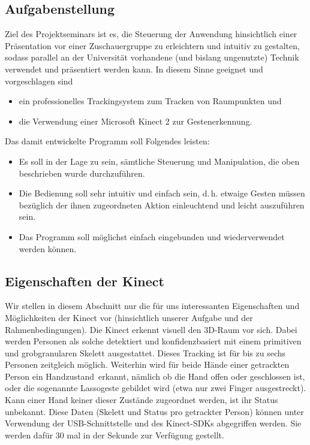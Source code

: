 \documentclass[12pt,a4paper]{article}
\begin{document}
	\subsection{Aufgabenstellung}
	Ziel des Projektseminars ist es, die Steuerung der Anwendung hinsichtlich einer Präsentation vor einer Zuschauergruppe zu erleichtern und intuitiv zu gestalten, sodass parallel an der Universität vorhandene (und bislang ungenutzte) Technik verwendet und präsentiert werden kann. In diesem Sinne geeignet und vorgeschlagen sind
	\begin{itemize}
		\item ein professionelles Trackingsystem zum Tracken von Raumpunkten und
		\item die Verwendung einer Microsoft Kinect 2 zur Gestenerkennung.
	\end{itemize}\par 
	Das damit entwickelte Programm soll Folgendes leisten:
	\begin{itemize}
		\item Es soll in der Lage zu sein, sämtliche Steuerung und Manipulation, die oben beschrieben wurde durchzuführen.
		\item Die Bedienung soll sehr intuitiv und einfach sein, d.\,h. etwaige Gesten müssen bezüglich der ihnen zugeordneten Aktion einleuchtend und leicht auszuführen sein.
		\item Das Programm soll möglichst einfach eingebunden und wiederverwendet werden können.		
	\end{itemize}
\subsection{Eigenschaften der Kinect} 
	Wir stellen in diesem Abschnitt nur die für uns interessanten Eigenschaften und Möglichkeiten der Kinect vor (hinsichtlich unserer Aufgabe und der Rahmenbedingungen). Die Kinect erkennt visuell den 3D-Raum vor sich. Dabei werden Personen als solche detektiert und konfidenzbasiert mit einem primitiven und grobgranularen Skelett ausgestattet. Dieses Tracking ist für bis zu sechs Personen zeitgleich möglich. Weiterhin wird für beide Hände einer getrackten Person ein \glqq Handzustand\grqq~erkannt, nämlich ob die Hand offen oder geschlossen ist, oder die sogenannte Lassogeste gebildet wird (etwa nur zwei Finger ausgestreckt). Kann einer Hand keiner dieser Zustände zugeordnet werden, ist ihr Status unbekannt. Diese Daten (Skelett und Status pro getrackter Person) können unter Verwendung der USB-Schnittstelle und des Kinect-SDKs abgegriffen werden. Sie werden dafür 30 mal in der Sekunde zur Verfügung gestellt.
\end{document}

